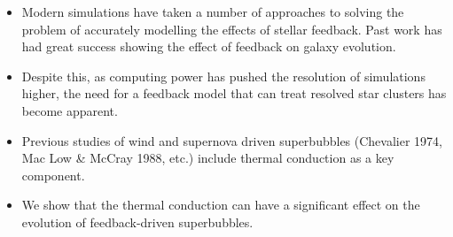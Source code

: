 \documentclass{report}
\begin{document}
\fontsize{30pt}{1em}\selectfont
\color{white}
\begin{itemize}
\item Modern simulations have taken a number of approaches to solving the problem of
accurately modelling the effects of stellar feedback. Past work has had great
success showing the effect of feedback on galaxy evolution.  
\item Despite this, as computing power has pushed the resolution of simulations 
higher, the need for a feedback model that can treat resolved star clusters has 
become apparent.
\item Previous studies of wind and supernova driven superbubbles (Chevalier 1974, Mac Low
\& McCray 1988, etc.) include thermal conduction as a key component.
\item We show that the thermal conduction can have a significant effect on the
evolution of feedback-driven superbubbles.
\end{itemize}
\end{document}
